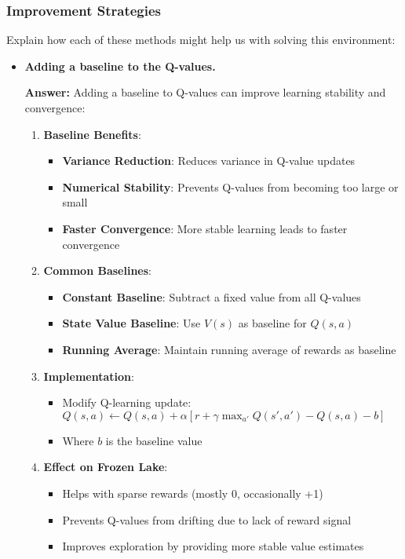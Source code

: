 \subsubsection{Improvement Strategies}
Explain how each of these methods might help us with solving this environment:
\begin{itemize} 
    \item \textbf{Adding a baseline to the Q-values.}
    
    \textbf{Answer:} Adding a baseline to Q-values can improve learning stability and convergence:
    
    \begin{enumerate}
        \item \textbf{Baseline Benefits}:
        \begin{itemize}
            \item \textbf{Variance Reduction}: Reduces variance in Q-value updates
            \item \textbf{Numerical Stability}: Prevents Q-values from becoming too large or small
            \item \textbf{Faster Convergence}: More stable learning leads to faster convergence
        \end{itemize}
        
        \item \textbf{Common Baselines}:
        \begin{itemize}
            \item \textbf{Constant Baseline}: Subtract a fixed value from all Q-values
            \item \textbf{State Value Baseline}: Use $V(s)$ as baseline for $Q(s,a)$
            \item \textbf{Running Average}: Maintain running average of rewards as baseline
        \end{itemize}
        
        \item \textbf{Implementation}:
        \begin{itemize}
            \item Modify Q-learning update: $Q(s,a) \leftarrow Q(s,a) + \alpha[r + \gamma \max_{a'} Q(s',a') - Q(s,a) - b]$
            \item Where $b$ is the baseline value
        \end{itemize}
        
        \item \textbf{Effect on Frozen Lake}:
        \begin{itemize}
            \item Helps with sparse rewards (mostly 0, occasionally +1)
            \item Prevents Q-values from drifting due to lack of reward signal
            \item Improves exploration by providing more stable value estimates
        \end{itemize}
    \end{enumerate}
    

\end{itemize}
